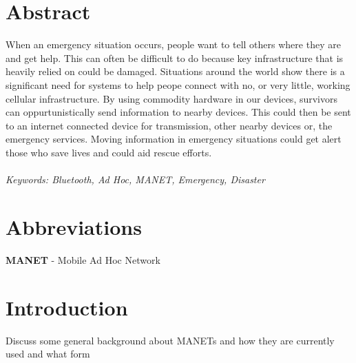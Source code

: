 \documentclass{report}
\begin{document}
\chapter*{Abstract}

When an emergency situation occurs, people want to tell others where they are and get help. 
This can often be difficult to do because key infrastructure that is heavily relied on could be damaged.
Situations around the world show there is a significant need for systems to help peope connect with no, or very little, working cellular infrastructure. 
By using commodity hardware in our devices, survivors can oppurtunistically send information to nearby devices. 
This could then be sent to an internet connected device for transmission, other nearby devices or, the emergency services. 
Moving information in emergency situations could get alert those who save lives and could aid rescue efforts.
\\
\\
\textit{Keywords: Bluetooth, Ad Hoc, MANET, Emergency, Disaster}



\chapter*{Abbreviations}

\textbf{MANET} - Mobile Ad Hoc Network


\tableofcontents{}

\chapter{Introduction}

Discuss some general background about MANETs and how they are currently used and what form
\end{document}
